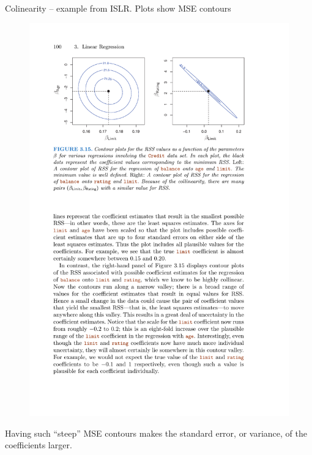 \documentclass[aspectratio=169]{beamer}
\begin{document}
\begin{frame}{Colinearity -- example from ISLR. Plots show MSE contours}

\begin{figure}
\includegraphics[height=0.7\textheight]{ISLR_fig3_15}
\caption*{}
\end{figure}

\vspace{-10mm}

Having such ``steep'' MSE contours makes the standard error, or variance, of the coefficients larger.  

\end{frame}
\end{document}
